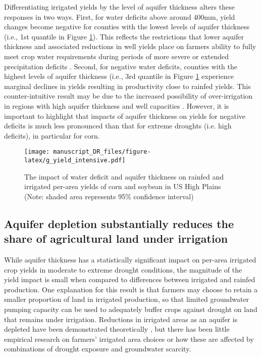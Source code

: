 \documentclass[
]{article}
\begin{document}
Differentiating irrigated yields by the level of aquifer thickness alters these responses in two ways. First, for water deficits above around 400mm, yield changes become negative for counties with the lowest levels of aquifer thickness (i.e., 1st quantile in Figure \ref{fig:yield-response}). This reflects the restrictions that lower aquifer thickness and associated reductions in well yields place on farmers ability to fully meet crop water requirements during periods of more severe or extended precipitation deficits \citep{rad2020effects, foster2014modeling, hrozencik2017heterogeneous}. Second, for negative water deficits, counties with the highest levels of aquifer thickness (i.e., 3rd quantile in Figure \ref{fig:yield-response} experience marginal declines in yields resulting in productivity close to rainfed yields. This counter-intuitive result may be due to the increased possibility of over-irrigation in regions with high aquifer thickness and well capacities \citep{foster2019assessing,gibson2017case,gibson2019benchmarking}. However, it is important to highlight that impacts of aquifer thickness on yields for negative deficits is much less pronounced than that for extreme droughts (i.e. high deficits), in particular for corn.

\begin{figure}

{\centering \texttt{[image: manuscript\_DR\_files/figure-latex/g\_yield\_intensive.pdf]} 

}

\caption{The impact of water deficit and aquifer thickness on rainfed and irrigated per-area yields of corn and soybean in US High Plains (Note: shaded area represents 95\% confidence interval)}\label{fig:yield-response}
\end{figure}

\hypertarget{the-impact-of-saturated-thickness-on-the-share-of-irrigated-production}{%
\subsection{Aquifer depletion substantially reduces the share of agricultural land under irrigation}\label{the-impact-of-saturated-thickness-on-the-share-of-irrigated-production}}

While aquifer thickness has a statistically significant impact on per-area irrigated crop yields in moderate to extreme drought conditions, the magnitude of the yield impact is small when compared to differences between irrigated and rainfed production. One explanation for this result is that farmers may choose to retain a smaller proportion of land in irrigated production, so that limited groundwater pumping capacity can be used to adequately buffer crops against drought on land that remains under irrigation. Reductions in irrigated areas as an aquifer is depleted have been demonstrated theoretically \citep{rad2020effects, foster2014modeling, hrozencik2017heterogeneous,deines2020transitions}, but there has been little empirical research on farmers' irrigated area choices or how these are affected by combinations of drought exposure and groundwater scarcity. 
\end{document}
